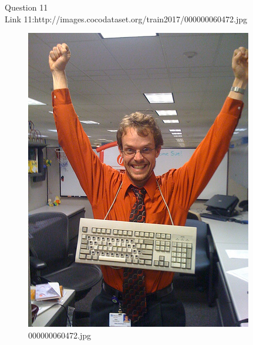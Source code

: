 Question 11\\
Link 11:http://images.cocodataset.org/train2017/000000060472.jpg
    \begin{figure}[h]
        \centering
        \includegraphics[width=0.8\linewidth]{../image set/easy/000000060472.jpg}
        \caption{000000060472.jpg}
    \end{figure}

